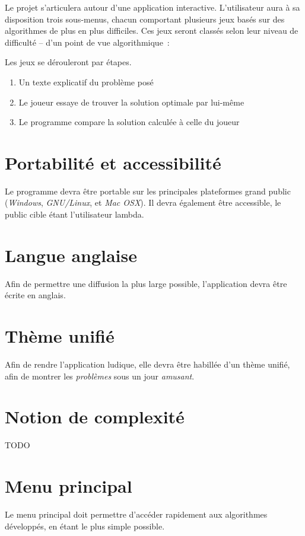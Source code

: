 Le projet s'articulera autour d'une application interactive.
  L'utilisateur aura à sa disposition trois sous-menus, chacun comportant
  plusieurs jeux basés sur des algorithmes de plus en plus difficiles.
  Ces jeux seront classés selon leur niveau de difficulté -- d'un point de
  vue algorithmique~:

Les jeux se dérouleront par étapes.
\begin{enumerate}
    \item Un texte explicatif du problème posé
    \item Le joueur essaye de trouver la solution optimale par lui-même
    \item Le programme compare la solution calculée à celle du joueur
\end{enumerate}

\section{Portabilité et accessibilité}
    Le programme devra être portable sur les principales plateformes
    grand public (\emph{Windows}, \emph{GNU/Linux}, et \emph{Mac OSX}).
    Il devra également être accessible, le public cible étant
    l'utilisateur lambda.

\section{Langue anglaise}
    Afin de permettre une diffusion la plus large possible,
    l'application devra être écrite en anglais.

\section{Thème unifié}
    Afin de rendre l'application ludique, elle devra
    être habillée d'un thème unifié,
    afin de montrer les \emph{problèmes} sous un
    jour \emph{amusant}.

\section{Notion de complexité}
TODO

\section{Menu principal}
    Le menu principal doit permettre d'accéder rapidement
    aux algorithmes développés, en étant le plus simple possible.

